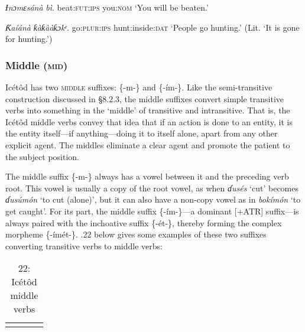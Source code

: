 \begin{table}
\textit{Ɨnɔmɛs}\textit{án}\textit{à}   \textit{bì}.
beat:\textsc{fut:ips}  you:\textsc{nom}
‘You will be beaten.’




\textit{Ƙaí}\textit{án}\textit{à}   \textit{ƙàƙààƙɔkᵋ.}
go:\textsc{plur:ips} hunt:inside:\textsc{dat}
‘People go hunting.’ (Lit. ‘It is gone for hunting.’)




\subsubsection{Middle (\textsc{mid})}

Icétôd has two \textsc{middle} suffixes: \{-m-\} and \{-ím-\}. Like the semi-transitive construction discussed in §8.2.3, the middle suffixes convert simple transitive verbs into something in the ‘middle’ of transitive and intransitive. That is, the Icétôd middle verbs convey that idea that if an action is done to an entity, it is the entity itself—if anything—doing it to itself alone, apart from any other explicit agent. The middles eliminate a clear agent and promote the patient to the subject position. 

The middle suffix \{-m-\} always has a vowel between it and the preceding verb root. This vowel is usually a copy of the root vowel, as when \textit{ɗusés }‘cut’ becomes \textit{ɗusúmón }‘to cut (alone)’, but it can also have a non-copy vowel as in \textit{bokímón }‘to get caught’. For its part, the middle suffix \{-ím-\}—a dominant [+ATR] suffix—is always paired with the inchoative suffix \{-ét-\}, thereby forming the complex morpheme \{-ímét-\}. .22 below gives some examples of these two suffixes converting transitive verbs to middle verbs:


\begin{table}
\caption{22: Icétôd middle verbs}
\label{tab:8}


\begin{tabularx}{\textwidth}{XXXX}
\lsptoprule


\end{tabularx}
\end{table}
\end{table}
